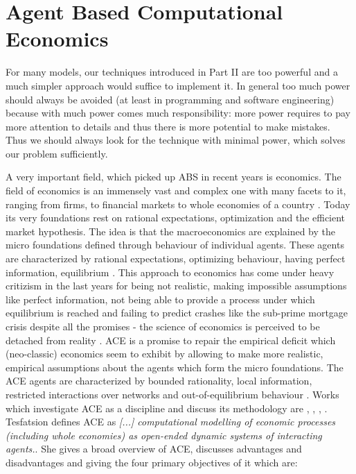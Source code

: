 \section{Agent Based Computational Economics}
For many models, our techniques introduced in Part II are too powerful and a much simpler approach would suffice to implement it. In general too much power should always be avoided (at least in programming and software engineering) because with much power comes much responsibility: more power requires to pay more attention to details and thus there is more potential to make mistakes. Thus we should always look for the technique with minimal power, which solves our problem sufficiently.

A very important field, which picked up ABS in recent years is economics. The field of economics is an immensely vast and complex one with many facets to it, ranging from firms, to financial markets to whole economies of a country \cite{bowles_understanding_2005}. Today its very foundations rest on rational expectations, optimization and the efficient market hypothesis. The idea is that the macroeconomics are explained by the micro foundations \cite{colell_microeconomic_1995} defined through behaviour of individual agents. These agents are characterized by rational expectations, optimizing behaviour, having perfect information, equilibrium \cite{focardi_is_2015}.
This approach to economics has come under heavy critizism in the last years for being not realistic, making impossible assumptions like perfect information, not being able to provide a process under which equilibrium is reached \cite{kirman_complex_2010} and failing to predict crashes like the sub-prime mortgage crisis despite all the promises - the science of economics is perceived to be detached from reality \cite{focardi_is_2015}. 
ACE is a promise to repair the empirical deficit which (neo-classic) economics seem to exhibit by allowing to make more realistic, empirical assumptions about the agents which form the micro foundations. The ACE agents are characterized by bounded rationality, local information, restricted interactions over networks and out-of-equilibrium behaviour \cite{farmer_economy_2009}. 
Works which investigate ACE as a discipline and discuss its methodology are \cite{tesfatsion_agent-based_2002}, \cite{richiardi_agent-based_2007}, \cite{ballot_agent-based_2015}, \cite{blume_introduction_2015}.
Tesfatsion \cite{tesfatsion_agent-based_2017} defines ACE as \textit{[...] computational modelling of economic processes (including whole economies) as open-ended dynamic systems of interacting agents.}. She gives a broad overview \cite{tesfatsion_agent-based_2006} of ACE, discusses advantages and disadvantages and giving the four primary objectives of it which are:

